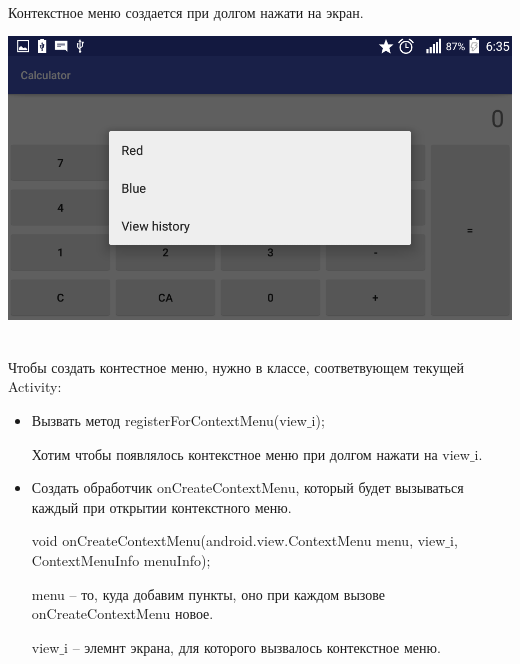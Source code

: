 
\\

    Контекстное меню создается при долгом нажати на экран.

    \includegraphics[scale=0.5]{06-context-menus/Screenshot.png}
    
\\

    Чтобы создать контестное меню, нужно в классе, соответвующем текущей Activity: 
    
    \begin{itemize}
        \item Вызвать метод registerForContextMenu(view$\_$i);
    
        Хотим чтобы появлялось контекстное меню при долгом нажати на view$\_$i.
    
        \item Создать обработчик onCreateContextMenu, который будет вызываться каждый при открытии контекстного меню.
    
        void onCreateContextMenu(android.view.ContextMenu menu, view$\_$i, ContextMenuInfo menuInfo);
    
        menu -- то, куда добавим пункты, оно при каждом вызове onCreateContextMenu новое. 
    
        view$\_$i -- элемнт экрана, для которого вызвалось контекстное меню.
    \end{itemize}


\\

